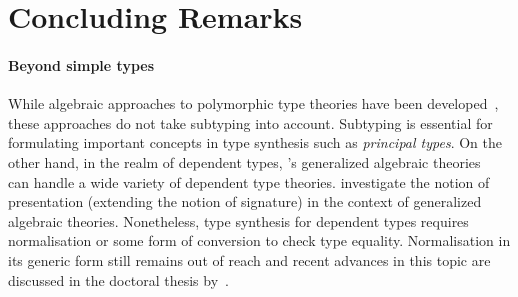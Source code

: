 
\section{Concluding Remarks} \label{sec:future}



\paragraph{Beyond simple types}
While algebraic approaches to polymorphic type theories have been developed~\citep{Fiore2013,Hamana2011}, these approaches do not take subtyping into account.
Subtyping is essential for formulating important concepts in type synthesis such as \emph{principal types}.
On the other hand, in the realm of dependent types, \citeauthor{Cartmell1986}'s generalized algebraic theories~\citeyearpar{Cartmell1986} can handle a wide variety of dependent type theories.
\citet{Bezem2021} investigate the notion of presentation (extending the notion of signature) in the context of generalized algebraic theories.
Nonetheless, type synthesis for dependent types requires normalisation or some form of conversion to check type equality.
Normalisation in its generic form still remains out of reach and recent advances in this topic are discussed in the doctoral thesis by~\citet{Valliappan2023}.
